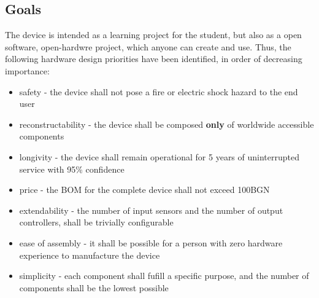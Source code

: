 \subsection{Goals}
The device is intended as a learning project for the student, but also as a open software, open-hardwre project, which anyone can create and use.
Thus, the following hardware design priorities have been identified, in order of decreasing importance:
\begin{itemize}
\item{safety - the device shall not pose a fire or electric shock hazard to the end user}
\item{reconstructability - the device shall be composed \textbf{only} of worldwide accessible components}
\item{longivity - the device shall remain operational for 5 years of uninterrupted service with 95\% confidence}
\item{price - the BOM for the complete device shall not exceed 100BGN}
\item{extendability - the number of input sensors and the number of output controllers, shall be trivially configurable}
\item{ease of assembly - it shall be possible for a person with zero hardware experience to manufacture the device}
\item{simplicity - each component shall fufill a specific purpose, and the number of components shall be the lowest possible}
\end{itemize}

